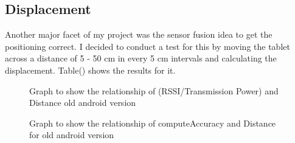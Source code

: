 \subsection{Displacement}
Another major facet of my project was the sensor fusion idea to get the positioning correct. I decided to conduct a test for this by moving the tablet across a distance of 5 - 50 cm in every 5 cm intervals and calculating the displacement. Table() shows the results for it.

\begin{figure}
\centering
{}
\caption{Graph to show the relationship of (RSSI/Transmission Power) and Distance old android version}
\label{oldRSSIDistance}
\end{figure}

\begin{figure}
\centering
{}
\caption{Graph to show the relationship of computeAccuracy and Distance for old android version}
\label{oldComputeAccuracyDistance}
\end{figure}

